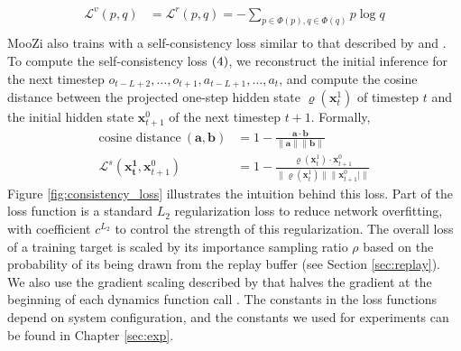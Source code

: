 \begin{align*}
    \mathcal{L}^v(p, q)  & = \mathcal{L}^r(p, q) = - \sum_{p \in \Phi(p), q \in \Phi(q)} p \log{q}  \\
\end{align*}
MooZi also trains with a self-consistency loss similar to that described by \citeauthor{MasteringAtariGames_Ye.Liu.ea_2021} and \citeauthor{VisualizingMuZeroModels_deVries.Voskuil.ea_2021} \cite{MasteringAtariGames_Ye.Liu.ea_2021,VisualizingMuZeroModels_deVries.Voskuil.ea_2021}.
To compute the self-consistency loss $(4)$, we reconstruct the initial inference for the next timestep \(o_{t-L+2}, \dots, o_{t+1}, a_{t-L+1}, \dots, a_{t}\), and compute the cosine distance between the projected one-step hidden state $\varrho(\mathbf{x}^1_t)$ of timestep $t$ and the initial hidden state $\mathbf{x}^0_{t+1}$ of the next timestep $t+1$.
Formally,
\begin{align*}
    \text{cosine distance} ~ (\mathbf{a}, \mathbf{b})
                                                       & = 1 - \frac{\mathbf{a} \cdot \mathbf{b}}{\|\mathbf{a}\|\|\mathbf{b}\|}  \\
    \mathcal{L}^s(\mathbf{x^1_t}, \mathbf{x}^0_{t+1})  & = 1 - \frac{\varrho(\mathbf{x}^1_t) \cdot \mathbf{x}^0_{t+1}}{\|\varrho(\mathbf{x}^1_t)\| \| \mathbf{x}^0_{t+1}|\|}
\end{align*}
Figure \ref{fig:consistency_loss} illustrates the intuition behind this loss.
Part  of the loss function is a standard $L_2$ regularization loss to reduce network overfitting,
with coefficient $c^{L_2}$ to control the strength of this regularization.
The overall loss of a training target is scaled by its importance sampling ratio $\rho$ based on the probability of its being drawn from the replay buffer (see Section \ref{sec:replay}).
We also use the gradient scaling described by \citeauthor{MasteringAtariGo_Schrittwieser.Antonoglou.ea_2020}
that halves the gradient at the beginning of each dynamics function call \cite{MasteringAtariGo_Schrittwieser.Antonoglou.ea_2020}.
The constants in the loss functions depend on system configuration, and the constants we used for experiments can be found in Chapter \ref{sec:exp}.

